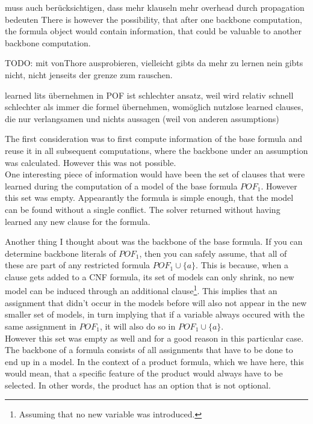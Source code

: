 muss auch berücksichtigen, dass mehr klauseln mehr overhead durch propagation bedeuten
There is however the possibility, that after one backbone computation, the formula object would contain information, that could be valuable to another backbone computation.

TODO: mit vonThore ausprobieren, vielleicht gibts da mehr zu lernen nein gibts nicht, nicht jenseits der grenze zum rauschen.








learned lits übernehmen in POF ist schlechter ansatz, weil wird relativ schnell schlechter als immer die formel übernehmen, womöglich nutzlose learned clauses, die nur verlangsamen und nichts aussagen (weil von anderen assumptions)



The first consideration was to first compute information of the base formula and reuse it in all subsequent computations, where the backbone under an assumption was calculated. However this was not possible.\\
One interesting piece of information would have been the set of clauses that were learned during the computation of a model of the base formula $POF_1$. However this set was empty. Appearantly the formula is simple enough, that the model can be found without a single conflict. The solver returned without having learned any new clause for the formula.

Another thing I thought about was the backbone of the base formula. If you can determine backbone literals of $POF_1$, then you can safely assume, that all of these are part of any restricted formula $POF_1 \cup \{a\}$. This is because, when a clause gets added to a CNF formula, its set of models can only shrink, no new model can be induced through an additional clause\footnote{Assuming that no new variable was introduced.}. This implies that an assignment that didn't occur in the models before will also not appear in the new smaller set of models, in turn implying that if a variable always occured with the same assignment in $POF_1$, it will also do so in $POF_1 \cup \{a\}$. \\
However this set was empty as well and for a good reason in this particular case. The backbone of a formula consists of all assignments that have to be done to end up in a model. In the context of a product formula, which we have here, this would mean, that a specific feature of the product would always have to be selected. In other words, the product has an option that is not optional. 

\fi